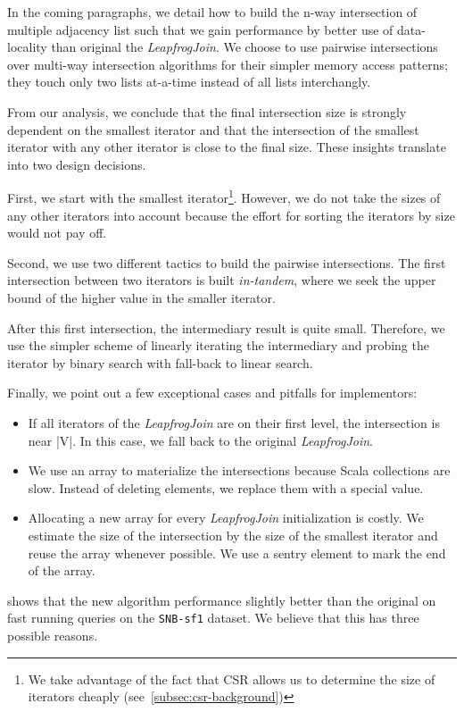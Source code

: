 In the coming paragraphs, we detail how to build the n-way intersection of multiple adjacency list
such that we gain performance by better use of data-locality than original the \textit{LeapfrogJoin}.
We choose to use pairwise intersections over multi-way intersection algorithms for their simpler memory access patterns;
they touch only two lists at-a-time instead of all lists interchangly.

From our analysis, we conclude that the final intersection size is strongly dependent on the
smallest iterator and that the intersection of the smallest iterator with any other iterator is
close to the final size.
These insights translate into two design decisions.

First, we start with the smallest iterator\footnote{We take advantage of the fact that CSR allows us
to determine the size of iterators cheaply (see~\cref{subsec:csr-background})}.
However, we do not take the sizes of any other iterators into account because the effort for
sorting the iterators by size would not pay off.

Second, we use two different tactics to build the pairwise intersections.
The first intersection between two iterators is built \textit{in-tandem},  where we seek
the upper bound of the higher value in the smaller iterator.

After this first intersection, the intermediary result is quite small.
Therefore, we use the simpler scheme of linearly iterating the intermediary and probing
the iterator by binary search with fall-back to linear search.

Finally, we point out a few exceptional cases and pitfalls for implementors:
\begin{itemize}
\item If all iterators of the \textit{LeapfrogJoin} are on their first level, the intersection is near |V|. In this case, we fall back
to the original
\textit{LeapfrogJoin}.
\item We use an array to materialize the intersections because Scala collections are slow.
Instead of deleting elements, we replace them with a special value.
\item Allocating a new array for every \textit{LeapfrogJoin} initialization is costly.
We estimate the size of the intersection by the size of the smallest iterator and reuse the array whenever possible. We use a sentry element to mark the end of the array.
\end{itemize}

 shows that the new algorithm performance slightly better than
the original on fast running queries on the \texttt{SNB-sf1} dataset.
We believe that this has three possible reasons.

